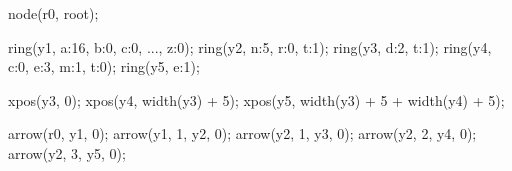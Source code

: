 

node(r0, root);

ring(y1, a:16, b:0, c:0, ..., z:0);
ring(y2, n:5, r:0, t:1);
ring(y3, d:2, t:1);
ring(y4, c:0, e:3, m:1, t:0);
ring(y5, e:1);

xpos(y3, 0);
xpos(y4, width(y3) + 5);
xpos(y5, width(y3) + 5 + width(y4) + 5);

arrow(r0, y1, 0);
arrow(y1, 1, y2, 0);
arrow(y2, 1, y3, 0);
arrow(y2, 2, y4, 0);
arrow(y2, 3, y5, 0);
